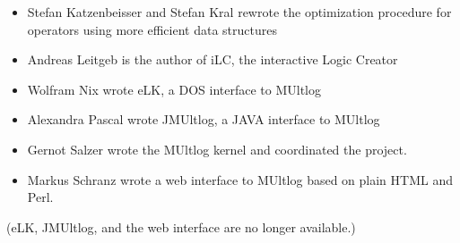 \documentclass[]{article}
\providecommand{\tightlist}{%
  \setlength{\itemsep}{0pt}\setlength{\parskip}{0pt}}
\begin{document}
\begin{itemize}
\tightlist
\item
  Stefan Katzenbeisser and Stefan Kral rewrote the optimization
  procedure for operators using more efficient data structures
\item
  Andreas Leitgeb is the author of iLC, the interactive Logic Creator
\item
  Wolfram Nix wrote eLK, a DOS interface to MUltlog
\item
  Alexandra Pascal wrote JMUltlog, a JAVA interface to MUltlog
\item
  Gernot Salzer wrote the MUltlog kernel and coordinated the project.
\item
  Markus Schranz wrote a web interface to MUltlog based on plain HTML
  and Perl.
\end{itemize}

(eLK, JMUltlog, and the web interface are no longer available.)
\end{document}
